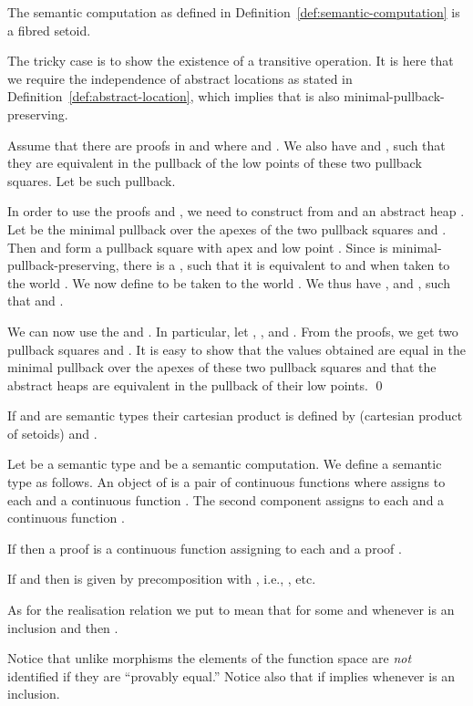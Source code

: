 \documentclass[orivec]{llncs}
\renewenvironment{proof}{\vspace{-1mm} \noindent {\bf Proof}\quad}{\qed}
\begin{document}
\begin{proposition}
The semantic computation  as defined in
Definition~\ref{def:semantic-computation} is a fibred setoid.
\end{proposition}
\begin{proof}
  The tricky case is to show the existence of a transitive operation.
  It is here that we require the independence of abstract locations as
  stated in Definition~\ref{def:abstract-location}, which implies that
   is also minimal-pullback-preserving.

Assume that there are proofs in  and  where 
 and . We also have  and , such that they are equivalent in the pullback of
the low points of these two pullback squares. Let  be such
pullback. 

In order to use the proofs  and , we need to construct
from  and  an abstract heap .
Let  be the minimal pullback over the apexes of the two pullback
squares  and . Then  and  form a pullback
square with apex  and low point . Since
 is minimal-pullback-preserving, there is a , such that it is equivalent to  and  when
taken to the world . We now define  to be  taken to the world . We thus have , and , such that  and .

We can now use the  and . In particular, 
let , , and . From the proofs, we get two
pullback squares  and . It
is easy to show that the values obtained are equal in the minimal pullback over 
the
apexes of these two pullback squares and that the abstract heaps are
equivalent in the pullback of their low points.
\end{proof} 

\begin{definition}
If  and  are semantic types their cartesian product  is defined by  (cartesian product of setoids) and . 
\end{definition}
\begin{definition}
  Let  be a semantic type and  be a
  semantic computation. We define a semantic type  as follows.  
  An object  of  is a pair  of
  continuous functions where  assigns to each  and
   a continuous function . The second component  assigns to each
   and  a continuous
  function .


  If  then a proof  is a continuous function assigning to each
   and  a proof .

  If  and 
  then  is given by precomposition with
  , i.e., , etc.



  As for the realisation relation  we put
   to mean that  for some
   and whenever  is an inclusion and
   then .
\end{definition}
Notice that unlike morphisms the elements of the function space are
\emph{not} identified if they are ``provably equal.''
Notice also that if  implies
 whenever 
is an inclusion.
\end{document}

